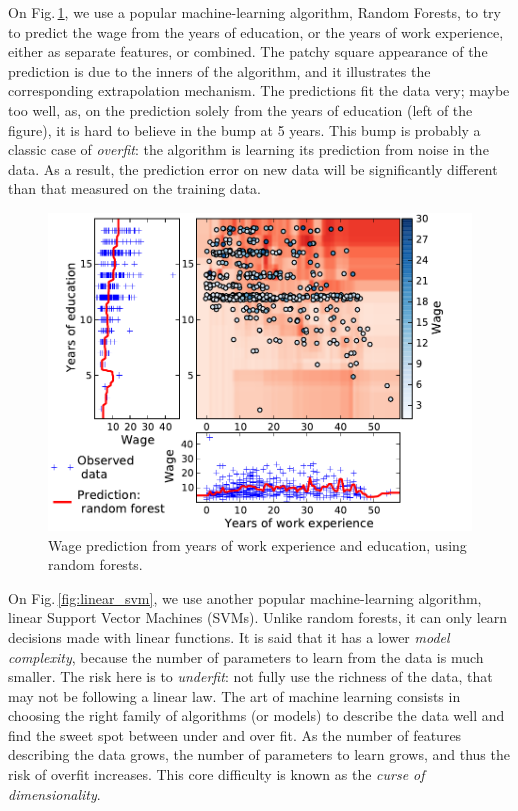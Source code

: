 \documentclass[a4paper]{article}
\begin{document}
On Fig.\,\ref{fig:random_forest}, we use a popular machine-learning
algorithm, Random Forests, to try to predict the wage from the years of
education, or the years of work experience, either as separate features,
or combined. The patchy square appearance of the prediction is due to the
inners of the algorithm, and it illustrates the corresponding
extrapolation mechanism. The predictions fit the data very; maybe too
well, as, on the prediction solely from the years of education (left of
the figure), it is hard to believe in the bump at 5 years. This bump is
probably a classic case of \emph{overfit}: the algorithm is learning its
prediction from noise in the data. As a result, the prediction error on
new data will be significantly different than that measured on the
training data.

\begin{figure}[b]
    \includegraphics[width=1.05\linewidth]{wage_data_random_forest}%

    \caption{Wage prediction from years of work experience and education,
    using random forests.\label{fig:random_forest}}
\end{figure}


On Fig.\,\ref{fig:linear_svm}, we use another popular machine-learning
algorithm, linear Support Vector Machines (SVMs). Unlike random forests,
it can only learn decisions made with linear functions. It is said that
it has a lower \emph{model complexity}, because the number of parameters
to learn from the data is much smaller. The risk here is to
\emph{underfit}: not fully use the richness of the data, that may not be
following a linear law. The art of machine learning consists in choosing
the right family of algorithms (or models) to describe the data well and
find the sweet spot between under and over fit. As the number of features
describing the data grows, the number of parameters to learn grows, and
thus the risk of overfit increases. This core difficulty is known as the
\emph{curse of dimensionality}.
\end{document}
